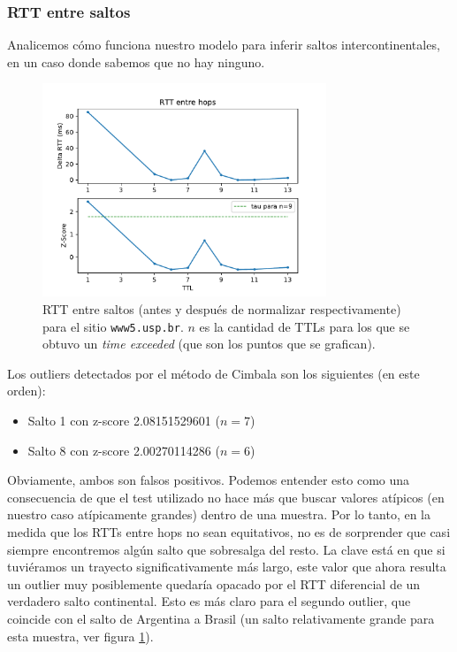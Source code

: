 \subsubsection*{RTT entre saltos}

Analicemos cómo funciona nuestro modelo para inferir saltos intercontinentales, en un caso donde sabemos que no hay ninguno.

\begin{figure}[H]
  \centering
  \includegraphics[width=8.5cm]{figs/traceroute-saopaulo.pdf}
  \caption{\footnotesize RTT entre saltos (antes y después de normalizar respectivamente) para el sitio \texttt{www5.usp.br}. $n$ es la cantidad de TTLs para los que se obtuvo un \emph{time exceeded} (que son los puntos que se grafican).}
  \label{plot-saopaulo}
\end{figure}

Los outliers detectados por el método de Cimbala son los siguientes (en este orden):
\begin{itemize}
  \item Salto 1 con z-score 2.08151529601 ($n=7$)
  \item Salto 8 con z-score 2.00270114286 ($n=6$)
\end{itemize}

Obviamente, ambos son falsos positivos. Podemos entender esto como una consecuencia de que el test utilizado no hace más que buscar valores atípicos (en nuestro caso atípicamente grandes) dentro de una muestra. Por lo tanto, en la medida que los RTTs entre hops no sean equitativos, no es de sorprender que casi siempre encontremos algún salto que sobresalga del resto. La clave está en que si tuviéramos un trayecto significativamente más largo, este valor que ahora resulta un outlier muy posiblemente quedaría opacado por el RTT diferencial de un verdadero salto continental. Esto es más claro para el segundo outlier, que coincide con el salto de Argentina a Brasil (un salto relativamente grande para esta muestra, ver figura \ref{plot-saopaulo}).

